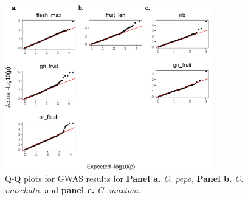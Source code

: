\documentclass[utf8]{frontiers_suppmat} %
\begin{document}
\clearpage

\begin{figure}[h]
	\begin{center}
		\includegraphics[width=0.8\textwidth]{../supplemental/03_subfig}%
	\end{center}
	\caption{Q-Q plots for GWAS results for \textbf{Panel a.} \textit{C. pepo}, \textbf{Panel b.} \textit{C. moschata}, and \textbf{panel c.} \textit{C. maxima.}\label{fig:2}}
\end{figure}
\end{document}
